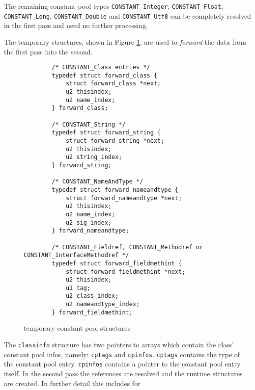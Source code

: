 \begingroup
{}
The remaining constant pool types \texttt{CONSTANT\_Integer},
\texttt{CONSTANT\_Float}, \texttt{CONSTANT\_Long},
\texttt{CONSTANT\_Double} and \texttt{CONSTANT\_Utf8} can be
completely resolved in the first pass and need no further processing.

\endgroup

The temporary structures, shown in Figure
\ref{constantpoolstructures}, are used to \textit{forward} the data
from the first pass into the second.

\begin{figure}[h]
\begin{verbatim}
        /* CONSTANT_Class entries */
        typedef struct forward_class {
            struct forward_class *next;
            u2 thisindex;
            u2 name_index;
        } forward_class;

        /* CONSTANT_String */
        typedef struct forward_string {
            struct forward_string *next;
            u2 thisindex;
            u2 string_index;
        } forward_string;

        /* CONSTANT_NameAndType */
        typedef struct forward_nameandtype {
            struct forward_nameandtype *next;
            u2 thisindex;
            u2 name_index;
            u2 sig_index;
        } forward_nameandtype;

        /* CONSTANT_Fieldref, CONSTANT_Methodref or CONSTANT_InterfaceMethodref */
        typedef struct forward_fieldmethint {
            struct forward_fieldmethint *next;
            u2 thisindex;
            u1 tag;
            u2 class_index;
            u2 nameandtype_index;
        } forward_fieldmethint;
\end{verbatim}
\caption{temporary constant pool structures}
\label{constantpoolstructures}
\end{figure}

The \texttt{classinfo} structure has two pointers to arrays which
contain the class' constant pool infos, namely: \texttt{cptags} and
\texttt{cpinfos}. \texttt{cptags} contains the type of the constant
pool entry. \texttt{cpinfos} contains a pointer to the constant pool
entry itself. In the second pass the references are resolved and the
runtime structures are created. In further detail this includes for

